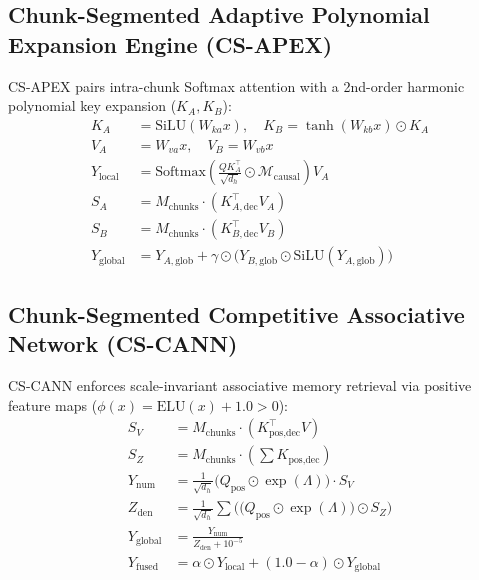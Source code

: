 \documentclass[twocolumn,10pt]{article}
\begin{document}
\subsection{Chunk-Segmented Adaptive Polynomial Expansion Engine (CS-APEX)}
CS-APEX pairs intra-chunk Softmax attention with a 2nd-order harmonic polynomial key expansion ($K_A, K_B$):
\begin{align*}
K_A &= \text{SiLU}(W_{ka} x), \quad K_B = \tanh(W_{kb} x) \odot K_A \\
V_A &= W_{va} x, \quad V_B = W_{vb} x \\
Y_{\text{local}} &= \text{Softmax}\!\left( \frac{Q K_A^\top}{\sqrt{d_h}} \odot \mathcal{M}_{\text{causal}} \right) V_A \\
S_A &= M_{\text{chunks}} \cdot (K_{A,\text{dec}}^\top V_A) \\
S_B &= M_{\text{chunks}} \cdot (K_{B,\text{dec}}^\top V_B) \\
Y_{\text{global}} &= Y_{A,\text{glob}} + \gamma \odot \Big( Y_{B,\text{glob}} \odot \text{SiLU}(Y_{A,\text{glob}}) \Big)
\end{align*}

\subsection{Chunk-Segmented Competitive Associative Network (CS-CANN)}
CS-CANN enforces scale-invariant associative memory retrieval via positive feature maps ($\phi(x) = \text{ELU}(x) + 1.0 > 0$):
\begin{align*}
S_V &= M_{\text{chunks}} \cdot (K_{\text{pos},\text{dec}}^\top V) \\
S_Z &= M_{\text{chunks}} \cdot \left( \sum K_{\text{pos},\text{dec}} \right) \\
Y_{\text{num}} &= \frac{1}{\sqrt{d_h}} \big(Q_{\text{pos}} \odot \exp(\Lambda)\big) \cdot S_V \\
Z_{\text{den}} &= \frac{1}{\sqrt{d_h}} \sum \Big( \big(Q_{\text{pos}} \odot \exp(\Lambda)\big) \odot S_Z \Big) \\
Y_{\text{global}} &= \frac{Y_{\text{num}}}{Z_{\text{den}} + 10^{-5}} \\
Y_{\text{fused}} &= \alpha \odot Y_{\text{local}} + (1.0 - \alpha) \odot Y_{\text{global}}
\end{align*}
\end{document}
